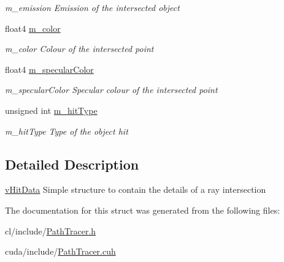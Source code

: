 \begin{DoxyCompactItemize}
\begin{DoxyCompactList}\small\item\em m\-\_\-emission Emission of the intersected object \end{DoxyCompactList}\item 
\hypertarget{structvHitData_a60941cabc95c8725b735e347a7bfb131}{float4 \hyperlink{structvHitData_a60941cabc95c8725b735e347a7bfb131}{m\-\_\-color}}\label{structvHitData_a60941cabc95c8725b735e347a7bfb131}

\begin{DoxyCompactList}\small\item\em m\-\_\-color Colour of the intersected point \end{DoxyCompactList}\item 
\hypertarget{structvHitData_a545715c83cca1fc45d163ec25c73a4d4}{float4 \hyperlink{structvHitData_a545715c83cca1fc45d163ec25c73a4d4}{m\-\_\-specular\-Color}}\label{structvHitData_a545715c83cca1fc45d163ec25c73a4d4}

\begin{DoxyCompactList}\small\item\em m\-\_\-specular\-Color Specular colour of the intersected point \end{DoxyCompactList}\item 
\hypertarget{structvHitData_a88bbaac303b8d1286ff4dbb83ecfbe01}{unsigned int \hyperlink{structvHitData_a88bbaac303b8d1286ff4dbb83ecfbe01}{m\-\_\-hit\-Type}}\label{structvHitData_a88bbaac303b8d1286ff4dbb83ecfbe01}

\begin{DoxyCompactList}\small\item\em m\-\_\-hit\-Type Type of the object hit \end{DoxyCompactList}\end{DoxyCompactItemize}


\subsection{Detailed Description}
\hyperlink{structvHitData}{v\-Hit\-Data} Simple structure to contain the details of a ray intersection 

The documentation for this struct was generated from the following files\-:\begin{DoxyCompactItemize}
\item 
cl/include/\hyperlink{PathTracer_8h}{Path\-Tracer.\-h}\item 
cuda/include/\hyperlink{PathTracer_8cuh}{Path\-Tracer.\-cuh}\end{DoxyCompactItemize}
